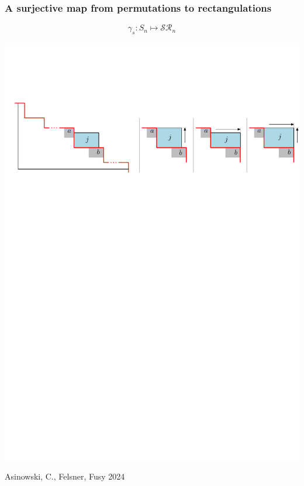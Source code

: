 \documentclass[11pt]{beamer}%
\newcommand{\green}{\color{darkgreen}}
\newcommand{\auth}[1]{{\green\hfill{\footnotesize #1}}}
\begin{document}
\begin{frame}
  \frametitle{A surjective map from permutations to rectangulations}
  \[
  \gamma_s : S_n \mapsto \mathcal{SR}_n
  \]
    \begin{center}
  \includegraphics[width=\textwidth]{strong-forward.pdf}
    \end{center}
    \auth{Asinowski, C., Felsner, Fusy 2024}
\end{frame}
\end{document}
